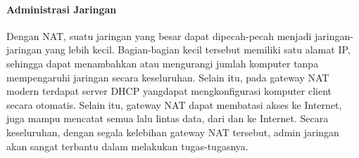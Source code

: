 \documentclass[a4paper,12pt]{article}
\begin{document}
\paragraph{Administrasi Jaringan\\}
Dengan NAT, suatu jaringan yang besar dapat dipecah-pecah menjadi jaringan-
jaringan yang lebih kecil. Bagian-bagian kecil tersebut memiliki satu alamat IP, sehingga
dapat menambahkan atau mengurangi jumlah komputer tanpa mempengaruhi jaringan
secara keseluruhan. Selain itu, pada gateway NAT modern terdapat server DHCP yangdapat mengkonfigurasi komputer client secara otomatis. Selain itu, gateway NAT dapat
membatasi akses ke Internet, juga mampu mencatat semua lalu lintas data, dari dan ke
Internet. Secara keseluruhan, dengan segala kelebihan gateway NAT tersebut, admin
jaringan akan sangat terbantu dalam melakukan tugas-tugasnya.
\end{document}
